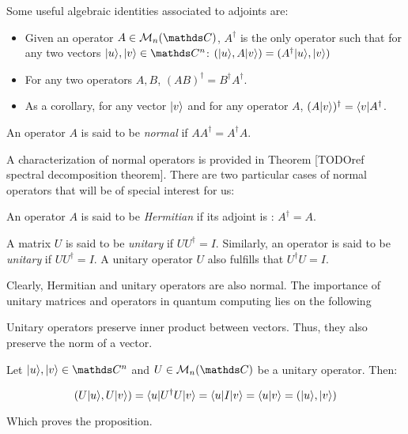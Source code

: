 Some useful algebraic identities associated to adjoints are:

\begin{itemize}
	\item Given an operator $A \in \mathcal{M}_{n}(\C)$, $A^\dagger$ is the only operator such that for any two vectors $|u\ra, |v\ra \in \C^n$: $( |u\rangle, A|v\rangle) = ( A^\dagger |u\rangle, |v\rangle)$
	\item For any two operators $A,B$, $(AB)^\dagger = B^\dagger A^\dagger$.
	\item As a corollary, for any vector $|v\rangle$ and for any operator $A$, $(A|v\rangle)^\dagger = \langle v|A^\dagger$.
\end{itemize}

\begin{definition}
	An operator $A$ is said to be \emph{normal} if $AA^\dagger = A^\dagger A$.
\end{definition}

A characterization of normal operators is provided in Theorem [TODOref spectral decomposition theorem]. There are two particular cases of normal operators that will be of special interest for us:

\begin{definition}
	An operator $A$ is said to be \emph{Hermitian} if its adjoint is : $A^\dagger = A$.
\end{definition}

\begin{definition}
	A matrix $U$ is said to be \emph{unitary} if $UU^\dagger = I$. Similarly, an operator is said to be \emph{unitary} if $UU^\dagger = I$. A unitary operator $U$ also fulfills that $U^\dagger U = I$.
\end{definition}

Clearly, Hermitian and unitary operators are also normal. The importance of unitary matrices and operators in quantum computing lies on the following

\begin{proposition}
	Unitary operators preserve inner product between vectors. Thus, they also preserve the norm of a vector.
\end{proposition}

\begin{proofs}
	Let $|u\ra, |v\ra \in \C^n$ and $U \in \mathcal{M}_n(\C)$ be a unitary operator. Then:
	
	$$ ( U|u\rangle, U|v\rangle) = \langle u|U^\dagger U|v\rangle = \langle u|I|v\rangle = \langle u|v\rangle = ( |u\rangle, |v\rangle) $$
	
	Which proves the proposition.
\end{proofs}

